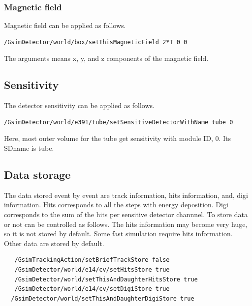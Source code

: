 \documentclass[a4paper,12pt]{article}
\begin{document}
 \subsubsection{Magnetic field}
 Magnetic field can be applied as follows.
 \begin{screen}
  \begin{verbatim}
/GsimDetector/world/box/setThisMagneticField 2*T 0 0\end{verbatim}
 \end{screen}
 The arguments means x, y, and z components of the magnetic field.
 
 
 \subsection{Sensitivity}
 The detector sensitivity can be applied as follows.
  \begin{screen}
   \begin{verbatim}
/GsimDetector/world/e391/tube/setSensitiveDetectorWithName tube 0\end{verbatim}
  \end{screen}
  Here, most outer volume for the tube  get sensitivity  with module ID,
  0. Its SDname is tube.

 \subsection{Data storage}
 The data stored event by event are
 track information, hits information, and, digi information.
 Hits corresponds to all the steps with energy deposition.
 Digi corresponds to the sum of the hits per sensitive detector
 channnel. To store data or not can be controlled as follows.
 The hits information may become very huge, so it is not stored by
 default. Some fast simulation require hits information. Other data
 are stored by default.
 \begin{screen}
   \begin{verbatim}
   /GsimTrackingAction/setBriefTrackStore false
   /GsimDetector/world/e14/cv/setHitsStore true
   /GsimDetector/world/setThisAndDaughterHitsStore true
   /GsimDetector/world/e14/cv/setDigiStore true
  /GsimDetector/world/setThisAndDaughterDigiStore true\end{verbatim}
  \end{screen}
  
\end{document}
